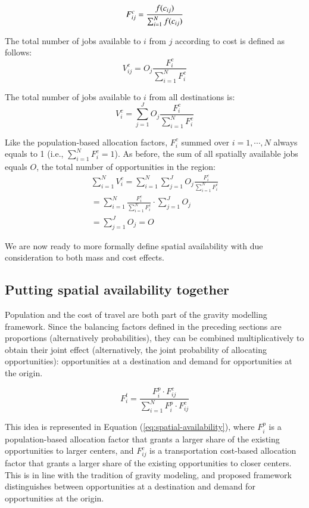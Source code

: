\documentclass[]{elsarticle} %
\begin{document}
\begin{equation}
\label{eq:tcost-alloc-factor}
F^c_{ij} = \frac{f(c_{ij})}{\sum_{i=1}^N f(c_{ij})}\\
\end{equation}

The total number of jobs available to \(i\) from \(j\) according to cost
is defined as follows: \[
V^c_{ij} = O_j\frac{F^c_{i}}{\sum_{i=1}^N F^c_{i}}
\]

The total number of jobs available to \(i\) from all destinations is: \[
V^c_{i} = \sum_{j=1}^J O_j\frac{F^c_{i}}{\sum_{i=1}^N F^c_{i}}
\]

Like the population-based allocation factors, \(F^c_{i}\) summed over
\(i=1,\cdots,N\) always equals to 1 (i.e.,
\(\sum_{i=1}^{N} F^c_{i} = 1\)). As before, the sum of all spatially
available jobs equals \(O\), the total number of opportunities in the
region: \[
\begin{array}{l}
\sum_{i=1}^N V^c_i =\sum_{i=1}^N\sum_{j=1}^JO_j\frac{F^c_{i}}{\sum_{i=1}^N F^c_{i}}\\
=\sum_{i=1}^N \frac{F^c_{i}}{\sum_{i=1}^N F^c_{i}}\cdot\sum_{j=1}^JO_j\\
=\sum_{j=1}^J O_j = O
\end{array}
\]

We are now ready to more formally define spatial availability with due
consideration to both mass and cost effects.

\hypertarget{putting-spatial-availability-together}{%
\subsection{Putting spatial availability
together}\label{putting-spatial-availability-together}}

Population and the cost of travel are both part of the gravity modelling
framework. Since the balancing factors defined in the preceding sections
are proportions (alternatively probabilities), they can be combined
multiplicatively to obtain their joint effect (alternatively, the joint
probability of allocating opportunities): opportunities at a destination
and demand for opportunities at the origin.

\begin{equation}
\label{eq:balancing-factors}
F^t_i = \frac{F^p_{i} \cdot F^c_{ij}}{\sum_{i=1}^N F^p_{i} \cdot F^c_{ij}}
\end{equation}

This idea is represented in Equation (\ref{eq:spatial-availability}),
where \(F^p_{i}\) is a population-based allocation factor that grants a
larger share of the existing opportunities to larger centers, and
\(F^c_{ij}\) is a transportation cost-based allocation factor that
grants a larger share of the existing opportunities to closer centers.
This is in line with the tradition of gravity modeling, and proposed
framework distinguishes between opportunities at a destination and
demand for opportunities at the origin.
\end{document}

